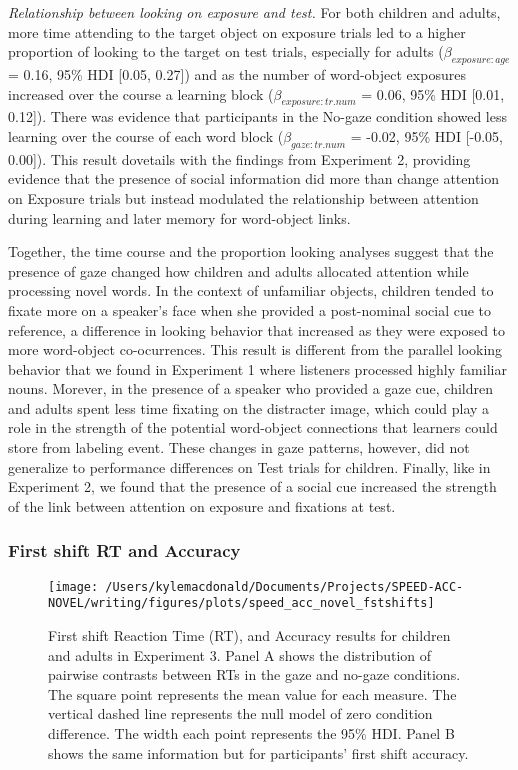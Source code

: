 \documentclass[man,floatsintext]{apa6}
\begin{document}
\emph{Relationship between looking on exposure and test.} For both
children and adults, more time attending to the target object on
exposure trials led to a higher proportion of looking to the target on
test trials, especially for adults (\(\beta_{exposure:age}\) = 0.16,
95\% HDI {[}0.05, 0.27{]}) and as the number of word-object exposures
increased over the course a learning block (\(\beta_{exposure:tr.num}\)
= 0.06, 95\% HDI {[}0.01, 0.12{]}). There was evidence that participants
in the No-gaze condition showed less learning over the course of each
word block (\(\beta_{gaze:tr.num}\) = -0.02, 95\% HDI {[}-0.05,
0.00{]}). This result dovetails with the findings from Experiment 2,
providing evidence that the presence of social information did more than
change attention on Exposure trials but instead modulated the
relationship between attention during learning and later memory for
word-object links.

Together, the time course and the proportion looking analyses suggest
that the presence of gaze changed how children and adults allocated
attention while processing novel words. In the context of unfamiliar
objects, children tended to fixate more on a speaker's face when she
provided a post-nominal social cue to reference, a difference in looking
behavior that increased as they were exposed to more word-object
co-ocurrences. This result is different from the parallel looking
behavior that we found in Experiment 1 where listeners processed highly
familiar nouns. Morever, in the presence of a speaker who provided a
gaze cue, children and adults spent less time fixating on the distracter
image, which could play a role in the strength of the potential
word-object connections that learners could store from labeling event.
These changes in gaze patterns, however, did not generalize to
performance differences on Test trials for children. Finally, like in
Experiment 2, we found that the presence of a social cue increased the
strength of the link between attention on exposure and fixations at
test.

\subsubsection{First shift RT and
Accuracy}\label{first-shift-rt-and-accuracy}

\begin{figure}[!t]

{\centering \texttt{[image: /Users/kylemacdonald/Documents/Projects/SPEED-ACC-NOVEL/writing/figures/plots/speed\_acc\_novel\_fstshifts]} 

}

\caption{First shift Reaction Time (RT), and Accuracy results for children and adults in Experiment 3. Panel A shows the distribution of pairwise contrasts between RTs in the gaze and no-gaze conditions. The square point represents the mean value for each measure. The vertical dashed line represents the null model of zero condition difference. The width each point represents the 95\% HDI. Panel B shows the same information but for participants' first shift accuracy.}\label{fig:speed-acc-novel-shifts}
\end{figure}
\end{document}

